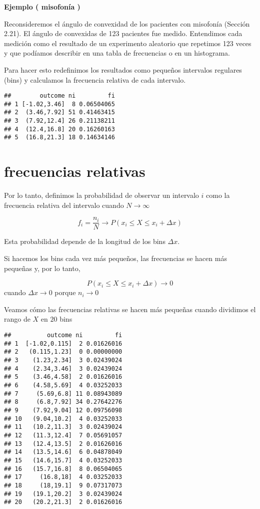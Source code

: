 \documentclass[
]{book}
\begin{document}
\textbf{Ejemplo ( misofonía )}

Reconsideremos el ángulo de convexidad de los pacientes con misofonía (Sección 2.21). El ángulo de convexidas de 123 pacientes fue medido. Entendimos cada medición como el resultado de un experimento aleatorio que repetimos 123 veces y que podíamos describir en una tabla de frecuencias o en un histograma.

Para hacer esto redefinimos los resultados como pequeños intervalos regulares (bins) y calculamos la frecuencia relativa de cada intervalo.

\begin{verbatim}
##        outcome ni         fi
## 1 [-1.02,3.46]  8 0.06504065
## 2  (3.46,7.92] 51 0.41463415
## 3  (7.92,12.4] 26 0.21138211
## 4  (12.4,16.8] 20 0.16260163
## 5  (16.8,21.3] 18 0.14634146
\end{verbatim}

\hypertarget{frecuencias-relativas-3}{%
\section{frecuencias relativas}\label{frecuencias-relativas-3}}

Por lo tanto, definimos la probabilidad de observar un intervalo \(i\) como la frecuencia relativa del intervalo cuando \(N \rightarrow \infty\)

\[ f_i =\frac{ n_ i }{ N} \rightarrow P( x_i \leq X \leq x_i + \Delta x)\]

Esta probabilidad depende de la longitud de los bins \(\Delta x\).

Si hacemos los bins cada vez más pequeños, las frecuencias se hacen más pequeñas y, por lo tanto,

\[P(x_i \leq X \leq x_i + \Delta x) \rightarrow 0\] cuando \(\Delta x \rightarrow 0\) porque \(n_i \rightarrow 0\)

Veamos cómo las frecuencias relativas se hacen más pequeñas cuando dividimos el rango de \(X\) en \(20\) bins

\begin{verbatim}
##          outcome ni         fi
## 1  [-1.02,0.115]  2 0.01626016
## 2   (0.115,1.23]  0 0.00000000
## 3    (1.23,2.34]  3 0.02439024
## 4    (2.34,3.46]  3 0.02439024
## 5    (3.46,4.58]  2 0.01626016
## 6    (4.58,5.69]  4 0.03252033
## 7     (5.69,6.8] 11 0.08943089
## 8     (6.8,7.92] 34 0.27642276
## 9    (7.92,9.04] 12 0.09756098
## 10   (9.04,10.2]  4 0.03252033
## 11   (10.2,11.3]  3 0.02439024
## 12   (11.3,12.4]  7 0.05691057
## 13   (12.4,13.5]  2 0.01626016
## 14   (13.5,14.6]  6 0.04878049
## 15   (14.6,15.7]  4 0.03252033
## 16   (15.7,16.8]  8 0.06504065
## 17     (16.8,18]  4 0.03252033
## 18     (18,19.1]  9 0.07317073
## 19   (19.1,20.2]  3 0.02439024
## 20   (20.2,21.3]  2 0.01626016
\end{verbatim}
\end{document}

